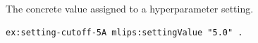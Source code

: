 The concrete value assigned to a hyperparameter setting.
\begin{lstlisting}[language=turtle]
ex:setting-cutoff-5A mlips:settingValue "5.0" .
\end{lstlisting}
